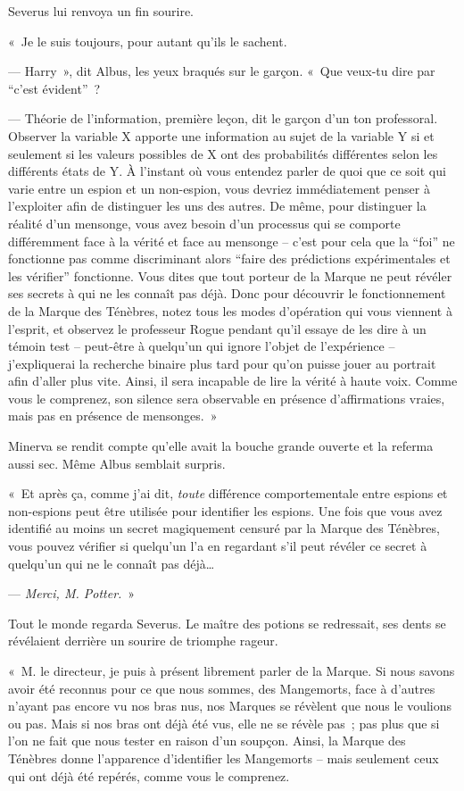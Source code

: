 Severus lui renvoya un fin sourire.

«~Je le suis toujours, pour autant qu'ils le sachent.

--- Harry~», dit Albus, les yeux braqués sur le garçon.
«~Que veux-tu dire par “c'est évident”~?

--- Théorie de l'information, première leçon, dit le garçon d'un ton professoral.
Observer la variable X apporte une information au sujet de la variable Y si et seulement si les valeurs possibles de X ont des probabilités différentes selon les différents états de Y.
À l'instant où vous entendez parler de quoi que ce soit qui varie entre un espion et un non-espion, vous devriez immédiatement penser à l'exploiter afin de distinguer les uns des autres.
De même, pour distinguer la réalité d'un mensonge, vous avez besoin d'un processus qui se comporte différemment face à la vérité et face au mensonge -- c'est pour cela que la “foi” ne fonctionne pas comme discriminant alors “faire des prédictions expérimentales et les vérifier” fonctionne.
Vous dites que tout porteur de la Marque ne peut révéler ses secrets à qui ne les connaît pas déjà.
Donc pour découvrir le fonctionnement de la Marque des Ténèbres, notez tous les modes d'opération qui vous viennent à l'esprit, et observez le professeur Rogue pendant qu'il essaye de les dire à un témoin test -- peut-être à quelqu'un qui ignore l'objet de l'expérience -- j'expliquerai la recherche binaire plus tard pour qu'on puisse jouer au portrait afin d'aller plus vite.
Ainsi, il sera incapable de lire la vérité à haute voix.
Comme vous le comprenez, son silence sera observable en présence d'affirmations vraies, mais pas en présence de mensonges.~»

Minerva se rendit compte qu'elle avait la bouche grande ouverte et la referma aussi sec.
Même Albus semblait surpris.

«~Et après ça, comme j'ai dit, \emph{toute} différence comportementale entre espions et non-espions peut être utilisée pour identifier les espions.
Une fois que vous avez identifié au moins un secret magiquement censuré par la Marque des Ténèbres, vous pouvez vérifier si quelqu'un l'a en regardant s'il peut révéler ce secret à quelqu'un qui ne le connaît pas déjà…

--- \emph{Merci, M. Potter.}~»

Tout le monde regarda Severus.
Le maître des potions se redressait, ses dents se révélaient derrière un sourire de triomphe rageur.

«~M. le directeur, je puis à présent librement parler de la Marque.
Si nous savons avoir été reconnus pour ce que nous sommes, des Mangemorts, face à d'autres n'ayant pas encore vu nos bras nus, nos Marques se révèlent que nous le voulions ou pas.
Mais si nos bras ont déjà été vus, elle ne se révèle pas~; pas plus que si l'on ne fait que nous tester en raison d'un soupçon.
Ainsi, la Marque des Ténèbres donne l'apparence d'identifier les Mangemorts -- mais seulement ceux qui ont déjà été repérés, comme vous le comprenez.

